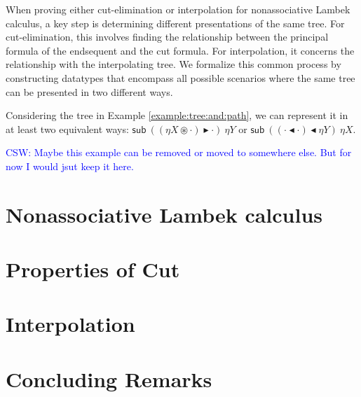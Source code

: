 \documentclass[runningheads]{llncs}
\newcommand{\cdast}{\circledast}
\newcommand{\btleft}{\blacktriangleleft}
\newcommand{\btright}{\blacktriangleright}
\newcommand{\sub}[2]{\mathsf{sub} ~ (#1) ~ #2}
\newcommand{\cheng}[1]{\textcolor{blue}{CSW: #1}}
\begin{document}
When proving either cut-elimination or interpolation for nonassociative Lambek calculus, a key step is determining different presentations of the same tree. For cut-elimination, this involves finding the relationship between the principal formula of the endsequent and the cut formula. For interpolation, it concerns the relationship with the interpolating tree. We formalize this common process by constructing datatypes that encompass all possible scenarios where the same tree can be presented in two different ways.
\begin{example}\label{example:same:tree:diff:sub}
  Considering the tree in Example \ref{example:tree:and:path}, we can represent it in at least two equivalent ways: $\sub{(\eta X \cdast \cdot) \btright \cdot}{\eta Y}$ or $\sub{(\cdot \btleft \cdot) \btleft \eta Y}{\eta X}$.
\end{example}\cheng{Maybe this example can be removed or moved to somewhere else. But for now I would jsut keep it here.}


\section{Nonassociative Lambek calculus}\label{sec:calculus}

\section{Properties of Cut}

\section{Interpolation}

\section{Concluding Remarks}
\end{document}
